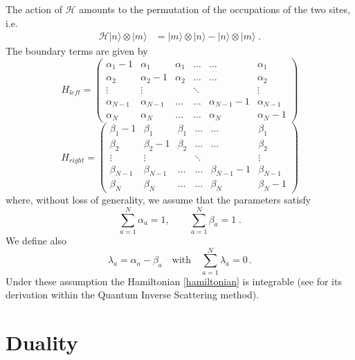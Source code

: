 \documentclass[10pt]{article}
\numberwithin{equation}{section}
\numberwithin{equation}{subsection}
\newcommand{\dt}{\;.}
\begin{document}
The action of $\mathcal{H}$ amounts to the permutation of the occupations of the two sites, i.e.
\begin{equation}
	\begin{split}
		\mathcal{H}|n\rangle\otimes   |m\rangle&=|m\rangle \otimes |n\rangle-|n\rangle \otimes|m\rangle\dt
	\end{split}
\end{equation}
The boundary terms are given by 
\begin{equation}
	H_{left}=\begin{pmatrix}
		\alpha_{1}-1&\alpha_{1}&\alpha_{1}&\ldots&\ldots&\alpha_{1}\\
		\alpha_{2}&\alpha_{2}-1&\alpha_{2}&\ldots&\ldots&\alpha_{2}\\
		\vdots&\vdots& &\ddots& &\vdots\\
		\alpha_{N-1}&\alpha_{N-1}&\ldots&\ldots&\alpha_{N-1}-1&\alpha_{N-1}\\
		\alpha_{N}&\alpha_{N}&\ldots&\ldots&\alpha_{N}&\alpha_{N}-1
	\end{pmatrix}
\end{equation}
\begin{equation}
	H_{right}=\begin{pmatrix}
		\beta_{1}-1&\beta_{1}&\beta_{1}&\ldots&\ldots&\beta_{1}\\
		\beta_{2}&\beta_{2}-1&\beta_{2}&\ldots&\ldots&\beta_{2}\\
		\vdots&\vdots& &\ddots& &\vdots\\
		\beta_{N-1}&\beta_{N-1}&\ldots&\ldots&\beta_{N-1}-1&\beta_{N-1}\\
		\beta_{N}&\beta_{N}&\ldots&\ldots&\beta_{N}&\beta_{N}-1
	\end{pmatrix}
\end{equation}
where, without loss of generality,  we assume that the parameters satisfy
\begin{equation}\label{ratesConditions}
	\sum_{a=1}^{N}\alpha_{a}=1,\qquad\sum_{a=1}^{N}\beta_{a}=1\;.
\end{equation} 
We define also 
\begin{equation}\label{lambdaConditions}
	\lambda_{a}=\alpha_{a}-\beta_{a}\quad\text{with}\quad \sum_{a=1}^{N}\lambda_{a}=0\,.
\end{equation}
Under these assumption the Hamiltonian \ref{hamiltonian} is integrable (see \cite{vanicat2017exact} for its derivation within the Quantum Inverse Scattering method). 


\section{Duality}\label{sectionDuality}
\end{document}
